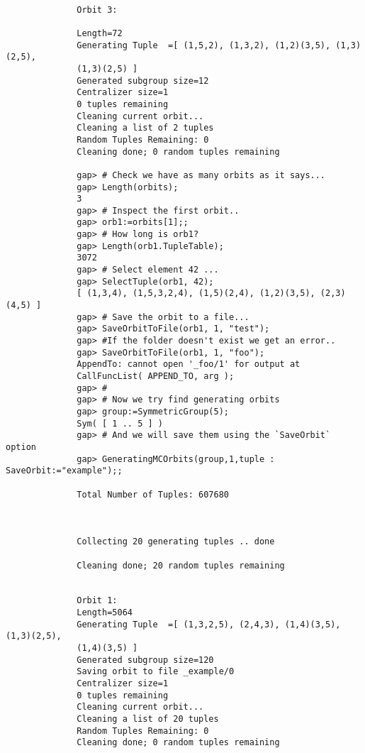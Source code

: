 \documentclass[a4paper,11pt]{report}
\begin{document}
{{\begin{Verbatim}[fontsize=\small,frame=single,label=Example]
  
              Orbit 3:
                                                                                    
              Length=72
              Generating Tuple  =[ (1,5,2), (1,3,2), (1,2)(3,5), (1,3)(2,5),
              (1,3)(2,5) ]
              Generated subgroup size=12
              Centralizer size=1
              0 tuples remaining
              Cleaning current orbit...
              Cleaning a list of 2 tuples
              Random Tuples Remaining: 0
              Cleaning done; 0 random tuples remaining
  
              gap> # Check we have as many orbits as it says...
              gap> Length(orbits);
              3
              gap> # Inspect the first orbit..
              gap> orb1:=orbits[1];;
              gap> # How long is orb1?
              gap> Length(orb1.TupleTable);
              3072
              gap> # Select element 42 ...
              gap> SelectTuple(orb1, 42);
              [ (1,3,4), (1,5,3,2,4), (1,5)(2,4), (1,2)(3,5), (2,3)(4,5) ]
              gap> # Save the orbit to a file...
              gap> SaveOrbitToFile(orb1, 1, "test");
              gap> #If the folder doesn't exist we get an error..
              gap> SaveOrbitToFile(orb1, 1, "foo");
              AppendTo: cannot open '_foo/1' for output at
              CallFuncList( APPEND_TO, arg );
              gap> #
              gap> # Now we try find generating orbits 
              gap> group:=SymmetricGroup(5);
              Sym( [ 1 .. 5 ] )
              gap> # And we will save them using the `SaveOrbit` option
              gap> GeneratingMCOrbits(group,1,tuple : SaveOrbit:="example");;
  
              Total Number of Tuples: 607680
  
  
  
              Collecting 20 generating tuples .. done
  
              Cleaning done; 20 random tuples remaining
  
  
              Orbit 1:                    
              Length=5064
              Generating Tuple  =[ (1,3,2,5), (2,4,3), (1,4)(3,5), (1,3)(2,5),
              (1,4)(3,5) ]
              Generated subgroup size=120
              Saving orbit to file _example/0
              Centralizer size=1
              0 tuples remaining
              Cleaning current orbit...
              Cleaning a list of 20 tuples
              Random Tuples Remaining: 0
              Cleaning done; 0 random tuples remaining
  

\end{Verbatim}}}
\end{document}
